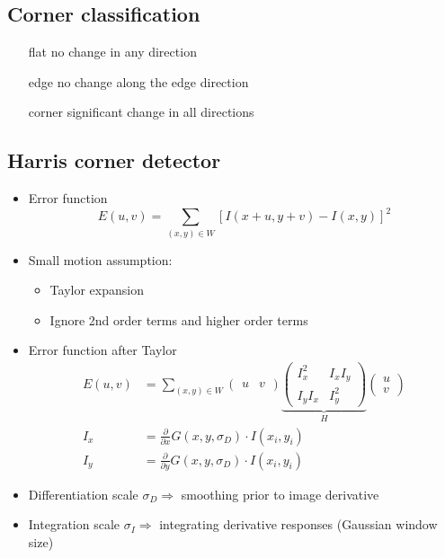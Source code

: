 \documentclass[12pt]{article}
\begin{document}
	\subsection{Corner classification}
	\begin{itemize}
		\item[flat] no change in any direction
		\item[edge] no change along the edge direction
		\item[corner] significant change in all directions
	\end{itemize}

	\subsection{Harris corner detector}
	
	\begin{itemize}
		\item Error function
			\begin{equation}
				E(u,v) = \sum_{(x,y) \in W} \left[ I(x+u,y+v) - I(x,y) \right]^2
			\end{equation}
		\item Small motion assumption:
		\begin{itemize}
			\item Taylor expansion
			\item Ignore 2nd order terms and higher order terms
		\end{itemize}
		\item Error function after Taylor
		\begin{align}
		E(u,v) &= \sum_{(x,y) \in W} 
		\begin{pmatrix}
		u & v
		\end{pmatrix}
		\underbrace{\begin{pmatrix}
			I_x^2 & I_xI_y \\
			I_yI_x& I_y^2
			\end{pmatrix}}_{H}
		\begin{pmatrix}
		u \\ v
		\end{pmatrix} \\
		I_x &= \frac{\partial}{\partial x}G(x,y,\sigma_D) \cdot I(x_i,y_i) \\
		I_y &= \frac{\partial}{\partial y}G(x,y,\sigma_D) \cdot I(x_i,y_i)
		\end{align}
		\item Differentiation scale $\sigma_D \Rightarrow$ smoothing prior to image derivative
		\item Integration scale $\sigma_I \Rightarrow$ integrating derivative responses (Gaussian window size)

\end{itemize}
\end{document}
